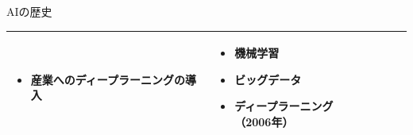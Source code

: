 \documentclass[dvipdfmx,aspectratio=169]{beamer}
\begin{document}
\begin{frame}[shrink]{AIの歴史}
\begin{table}[h]
\begin{tabular}{lp{35em}p{40em}}
\begin{minipage}{40em}
\begin{itemize}
													\item 産業への\alert{ディープラーニング}の導入
												\end{itemize}
											\end{minipage}                                
										& \begin{minipage}{35em}
											\begin{itemize}
												\item \alert{機械学習}
												\item \alert{ビッグデータ}
												\item \alert{ディープラーニング}（2006年）
											\end{itemize}
										\end{minipage}\\
				\bottomrule                                                                                                      
			\end{tabular}
		\end{table}
	\end{frame}
	
\end{document}
